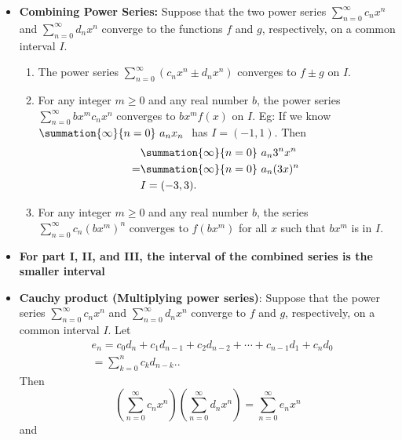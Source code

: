 \documentclass{report}
\begin{document}
\begin{itemize}
        \item \textbf{Combining Power Series:}
            Suppose that the two power series \(\sum_{n=0}^{\infty} c_n x^n\) and \(\sum_{n=0}^{\infty} d_n x^n\) converge to the functions \(f\) and \(g\), respectively, on a common interval \(I\).
            \begin{enumerate}[label=(\roman*)]
                \item The power series \(\sum_{n=0}^{\infty} (c_n x^n \pm d_n x^n)\) converges to \(f \pm g\) on \(I\).
                \item For any integer \(m \geq 0\) and any real number \(b\), the power series \(\sum_{n=0}^{\infty} b x^m c_n x^n\) converges to \(b x^m f(x)\) on \(I\).
                    \smallbreak \noindent
                    Eg: If we know $\summation{\infty}{n=0}\ a_{n}x_{n}\  $ has $I = (-1,1) $. Then
                    \begin{align*}
                            &\summation{\infty}{n=0}\ a_{n}3^{n}x^{n}\  \\
                        =&\summation{\infty}{n=0}\ a_{n}(3x)^{n}\  \\
                         &I=(-3,3)
                     .\end{align*}
                 \item For any integer \(m \geq 0\) and any real number \(b\), the series \(\sum_{n=0}^{\infty} c_n (b x^m)^n\) converges to \(f(b x^m)\) for all \(x\) such that \(b x^m\) is in \(I\).
             \end{enumerate}
         \item \textbf{For part I, II, and III, the interval of the combined series is the smaller interval}
         \item \textbf{Cauchy product (Multiplying power series)}:
             Suppose that the power series \(\sum_{n=0}^{\infty} c_n x^n\) and \(\sum_{n=0}^{\infty} d_n x^n\) converge to \(f\) and \(g\), respectively, on a common interval \(I\). Let
             \begin{align*}
                    &e_n = c_0 d_n + c_1 d_{n-1} + c_2 d_{n-2} + \cdots + c_{n-1} d_1 + c_n d_0  \\
                    &= \sum_{k=0}^{n} c_k d_{n-k}.
                .\end{align*}
                Then
                \[
                    \left( \sum_{n=0}^{\infty} c_n x^n \right) \left( \sum_{n=0}^{\infty} d_n x^n \right) = \sum_{n=0}^{\infty} e_n x^n
                \]
                and
                \[
\]
\end{itemize}
\end{document}

